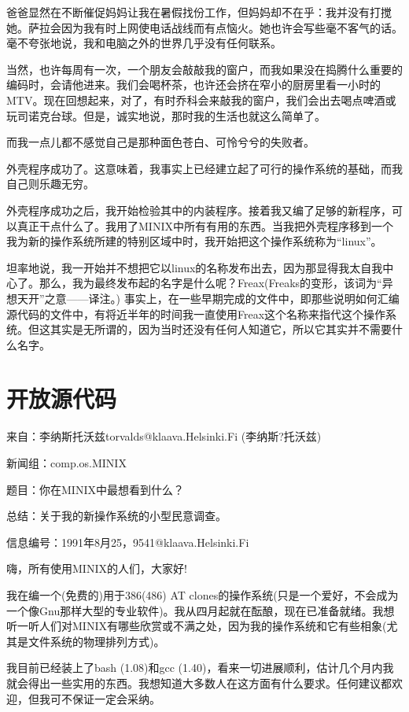 爸爸显然在不断催促妈妈让我在暑假找份工作，但妈妈却不在乎：我并没有打搅她。萨拉会因为我有时上网使电话战线而有点恼火。她也许会写些毫不客气的话。毫不夸张地说，我和电脑之外的世界几乎没有任何联系。

当然，也许每周有一次，一个朋友会敲敲我的窗户，而我如果没在捣腾什么重要的编码时，会请他进来。我们会喝杯茶，也许还会挤在窄小的厨房里看一小时的MTV。现在回想起来，对了，有时乔科会来敲我的窗户，我们会出去喝点啤酒或玩司诺克台球。但是，诚实地说，那时我的生活也就这么简单了。

而我一点儿都不感觉自己是那种面色苍白、可怜兮兮的失败者。

外壳程序成功了。这意味着，我事实上已经建立起了可行的操作系统的基础，而我自己则乐趣无穷。

外壳程序成功之后，我开始检验其中的内装程序。接着我又编了足够的新程序，可以真正干点什么了。我用了MINIX中所有有用的东西。当我把外壳程序移到一个我为新的操作系统所建的特别区域中时，我开始把这个操作系统称为“linux”。

坦率地说，我一开始并不想把它以linux的名称发布出去，因为那显得我太自我中心了。那么，我为最终发布起的名字是什么呢？Freax(Freaks的变形，该词为“异想天开”之意——译注。) 事实上，在一些早期完成的文件中，即那些说明如何汇编源代码的文件中，有将近半年的时间我一直使用Freax这个名称来指代这个操作系统。但这其实是无所谓的，因为当时还没有任何人知道它，所以它其实并不需要什么名字。

 
\section{开放源代码}

来自：李纳斯托沃兹torvalds@klaava.Helsinki.Fi (李纳斯?托沃兹)

新闻组：comp.os.MINIX

题目：你在MINIX中最想看到什么？

总结：关于我的新操作系统的小型民意调查。

信息编号：1991年8月25，9541@klaava.Helsinki.Fi

 

嗨，所有使用MINIX的人们，大家好!

我在编一个(免费的)用于386(486) AT clones的操作系统(只是一个爱好，不会成为一个像Gnu那样大型的专业软件)。我从四月起就在酝酿，现在已准备就绪。我想听一听人们对MINIX有哪些欣赏或不满之处，因为我的操作系统和它有些相象(尤其是文件系统的物理排列方式)。

我目前已经装上了bash (1.08)和gcc (1.40)，看来一切进展顺利，估计几个月内我就会得出一些实用的东西。我想知道大多数人在这方面有什么要求。任何建议都欢迎，但我可不保证一定会采纳。

